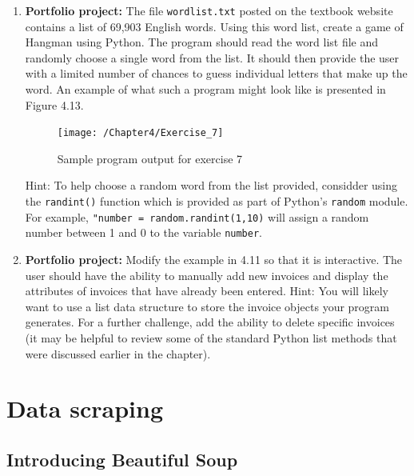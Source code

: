 \documentclass{book}
\begin{document}
\begin{enumerate}
	\item \textbf{Portfolio project:} The file \texttt{wordlist.txt} posted on the textbook website contains a list of 69,903 English words. Using this word list, create a game of Hangman using Python. The program should read the word list file and randomly choose a single word from the list. It should then provide the user with a limited number of chances to guess individual letters that make up the word. An example of what such a program might look like is presented in Figure 4.13.
	
	\begin{figure}[h]
		\caption{Sample program output for exercise 7}
		\centering\texttt{[image: /Chapter4/Exercise\_7]}
	\end{figure}

	Hint: To help choose a random word from the list provided, considder using the \texttt{randint()} function which is provided as part of Python's \texttt{random} module. For example, \texttt{"number = random.randint(1,10)} will assign a random number between 1 and 0 to the variable \texttt{number}.
	
	\item \textbf{Portfolio project:} Modify the example in 4.11 so that it is interactive. The user should have the ability to manually add new invoices and display the attributes of invoices that have already been entered. Hint: You will likely want to use a list data structure to store the invoice objects your program generates. For a further challenge, add the ability to delete specific invoices (it may be helpful to review some of the standard Python list methods that were discussed earlier in the chapter).
\end{enumerate}

\chapter{Data scraping}
\section{Introducing Beautiful Soup}
\end{document}
